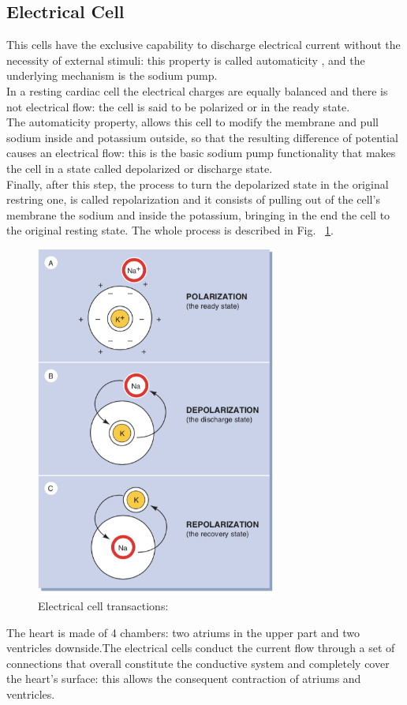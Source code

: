 \documentclass[LaM,binding=0.6cm]{sapthesis}
\begin{document}
\subsection{Electrical Cell}
This cells have the exclusive capability to discharge electrical current without the necessity of external stimuli: this property is called automaticity , and the underlying mechanism is the sodium pump.\\In a resting cardiac cell the electrical charges are equally balanced and there is not electrical flow: the cell is said to be polarized or in the ready state.\\The automaticity property, allows this cell to modify the membrane and pull sodium inside and potassium outside, so that the resulting difference of potential causes an electrical flow: this is the basic sodium pump functionality that makes the cell in a state called depolarized or discharge state.\\Finally, after this step, the process to turn the depolarized state in the original restring one, is called repolarization and it consists of pulling out of the cell's membrane the  sodium and inside the potassium, bringing in the end the cell to the original resting state. The whole process is described in Fig. ~\ref{fig:ecgtrans}.  
\begin{figure}[H] \centering
	\includegraphics[width=80mm,scale=0.7]{ecgtrans}
	\caption{Electrical cell transactions: \cite{ecgbook}}
	\label{fig:ecgtrans}
\end{figure}
The heart is made of 4 chambers: two atriums in the upper part and two ventricles downside.The electrical cells conduct the current flow through a set of connections that overall constitute the conductive system and completely cover the heart's surface: this allows the consequent contraction of atriums and ventricles.
\end{document}

